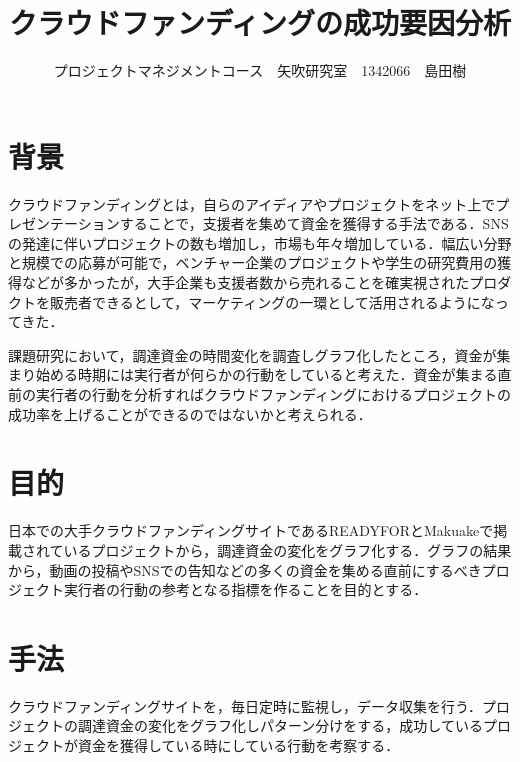 \documentclass[uplatex,twocolumn,dvipdfmx]{jsarticle}
\title{\vspace{-5mm}\fontsize{14pt}{0pt}\selectfont クラウドファンディングの成功要因分析}
\author{\normalsize プロジェクトマネジメントコース　矢吹研究室　1342066　島田樹}
\date{}
\begin{document}
\fontsize{10.5pt}{\baselineskip}\selectfont
\maketitle





\section{背景}
クラウドファンディング\cite{wiki}とは，自らのアイディアやプロジェクトをネット上でプレゼンテーションすることで，支援者を集めて資金を獲得する手法である．SNSの発達に伴いプロジェクトの数も増加し，市場も年々増加している\cite{visualizing}．幅広い分野と規模での応募が可能で，ベンチャー企業のプロジェクトや学生の研究費用の獲得などが多かったが，大手企業も支援者数から売れることを確実視されたプロダクトを販売者できるとして，マーケティングの一環として活用されるようになってきた．

課題研究において，調達資金の時間変化を調査しグラフ化したところ，資金が集まり始める時期には実行者が何らかの行動をしていると考えた．資金が集まる直前の実行者の行動を分析すればクラウドファンディングにおけるプロジェクトの成功率を上げることができるのではないかと考えられる．


\section{目的}
日本での大手クラウドファンディングサイトであるREADYFORとMakuakeで掲載されているプロジェクトから，調達資金の変化をグラフ化する．グラフの結果から，動画の投稿やSNSでの告知などの多くの資金を集める直前にするべきプロジェクト実行者の行動の参考となる指標を作ることを目的とする．


\section{手法}
クラウドファンディングサイトを，毎日定時に監視し，データ収集を行う．プロジェクトの調達資金の変化をグラフ化しパターン分けをする，成功しているプロジェクトが資金を獲得している時にしている行動を考察する．
\end{document}
